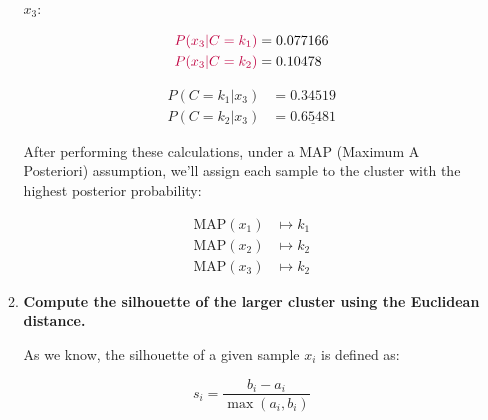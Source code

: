 \documentclass[12pt]{article}
\begin{document}
\begin{enumerate}[leftmargin=\labelsep]
\begin{enumerate}[leftmargin=\labelsep]
\begin{paracol}{3}
                  $x_3$:

                  \begin{normalsize}
                    \begin{equation*}
                      \begin{aligned}
                        \textcolor{purple}{P(x_3 | C = k_1)} & = 0.077166 \\
                        \textcolor{purple}{P(x_3 | C = k_2)} & = 0.10478
                      \end{aligned}
                    \end{equation*}

                    \begin{equation*}
                      \begin{aligned}
                        P(C = k_1 | x_3) & = 0.34519             \\
                        P(C = k_2 | x_3) & = \underline{0.65481}
                      \end{aligned}
                    \end{equation*}
                  \end{normalsize}

                \end{paracol}

                After performing these calculations, under a MAP (Maximum A Posteriori) assumption,
                we'll assign each sample to the cluster with the highest posterior probability:

                \begin{equation*}
                  \begin{aligned}
                    \text{MAP}(x_1) & \mapsto k_1 \\
                    \text{MAP}(x_2) & \mapsto k_2 \\
                    \text{MAP}(x_3) & \mapsto k_2
                  \end{aligned}
                \end{equation*}

                \pagebreak

          \item \textbf{Compute the silhouette of the larger cluster using the Euclidean distance.}

                As we know, the silhouette of a given sample $x_i$ is defined as:

                \begin{equation*}
                  s_i = \frac{b_i - a_i}{\max(a_i, b_i)}
                \end{equation*}


\end{enumerate}
\end{enumerate}
\end{document}
